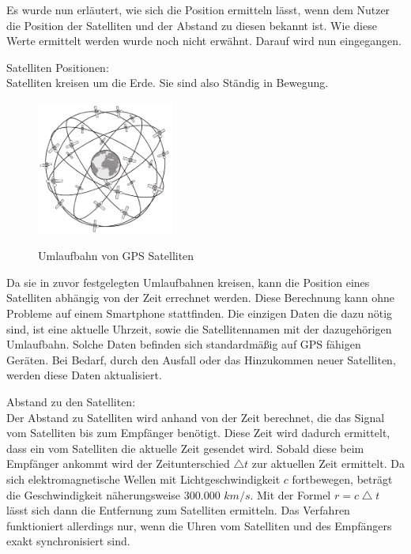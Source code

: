 Es wurde nun erläutert, wie sich die Position ermitteln lässt, wenn dem Nutzer die Position der Satelliten und der Abstand zu diesen bekannt ist. Wie diese Werte ermittelt werden wurde noch nicht erwähnt. Darauf wird nun eingegangen.

Satelliten Positionen:\\
Satelliten kreisen um die Erde. Sie sind also Ständig in Bewegung. 

\begin{figure}[h]
\centering
\includegraphics[width=0.4\textwidth]{ref/images/GPS_Umlaufbahn.PNG}
\caption[Umlaufbahn von GPS Satelliten]{Umlaufbahn von GPS Satelliten}
\label{fig:Umlaufbahn Satelliten}
\cite[S. 164]{Kuepper2005}
\end{figure}

Da sie in zuvor festgelegten Umlaufbahnen kreisen, kann die Position eines Satelliten abhängig von der Zeit errechnet werden. 
Diese Berechnung kann ohne Probleme auf einem Smartphone stattfinden. Die einzigen Daten die dazu nötig sind, ist eine aktuelle Uhrzeit, sowie die Satellitennamen mit der dazugehörigen Umlaufbahn. Solche Daten befinden sich standardmäßig auf GPS fähigen Geräten. Bei Bedarf, durch den Ausfall oder das Hinzukommen neuer Satelliten, werden diese Daten aktualisiert.


Abstand zu den Satelliten:\\
Der Abstand zu Satelliten wird anhand von der Zeit berechnet, die das Signal vom Satelliten bis zum Empfänger benötigt. Diese Zeit wird dadurch ermittelt, dass ein vom Satelliten die aktuelle Zeit gesendet wird. Sobald diese beim Empfänger ankommt wird der Zeitunterschied $ \bigtriangleup t $ zur aktuellen Zeit ermittelt. Da sich elektromagnetische Wellen mit Lichtgeschwindigkeit $ c $ fortbewegen, beträgt die Geschwindigkeit näherungsweise 300.000 $km/s$. Mit der Formel $ r = c \bigtriangleup t$ lässt sich dann die Entfernung zum Satelliten ermitteln. Das Verfahren funktioniert allerdings nur, wenn die Uhren vom Satelliten und des Empfängers exakt synchronisiert sind. 
\cite[S. 189]{Schiller2004}

